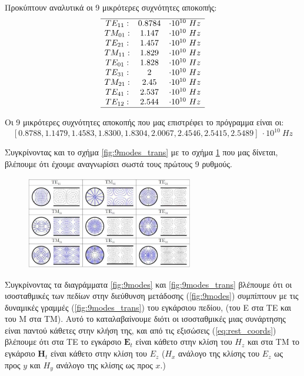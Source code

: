 \documentclass[10pt, letterpaper]{article}
\begin{document}
Προκύπτουν αναλυτικά οι 9 μικρότερες συχνότητες αποκοπής:
\[
\begin{matrix}
  \hline
  TE_{11}: &  0.8784 &\cdot 10^{10} \ Hz \\
  TM_{01}: & 1.147 &\cdot 10^{10} \ Hz \\
  TE_{21}: & 1.457 &\cdot 10^{10} \ Hz \\
  TM_{11}: & 1.829 &\cdot 10^{10} \ Hz \\
  TE_{01}: & 1.828 &\cdot 10^{10} \ Hz \\
  TE_{31}: & 2 &\cdot 10^{10} \ Hz \\
  TM_{21}: & 2.45 &\cdot 10^{10} \ Hz \\
  TE_{41}: & 2.537 &\cdot 10^{10} \ Hz \\
  TE_{12}: & 2.544 &\cdot 10^{10} \ Hz \\
  \hline
\end{matrix}
\]

Οι 9 μικρότερες συχνότητες αποκοπής που μας επιστρέφει το πρόγραμμα είναι οι:
\[ [0.8788, 1.1479, 1.4583, 1.8300, 1.8304, 2.0067, 2.4546, 2.5415, 2.5489] \ \cdot 10^{10} \ Hz \]



Συγκρίνοντας και το σχήμα \ref{fig:9modes_trans}
με το σχήμα 
\ref{fig:given} που μας δίνεται, βλέπουμε ότι έχουμε 
αναγνωρίσει σωστά τους πρώτους 9 ρυθμούς.

\begin{figure}[h]
  \centering
  \includegraphics[width=0.65\textwidth]{given.png}
  \caption{}
  \label{fig:given}
\end{figure}

Συγκρίνοντας τα διαγράμματα \ref{fig:9modes} και \ref{fig:9modes_trans} βλέπουμε ότι οι ισοσταθμικές των πεδίων στην διεύθυνση μετάδοσης (\ref{fig:9modes})
συμπίπτουν με τις δυναμικές γραμμές (\ref{fig:9modes_trans}) του εγκάρσιου πεδίου, (του Ε στα ΤΕ και του Μ στα ΤΜ). 
Αυτό το καταλαβαίνουμε διότι οι ισοσταθμικές μιας συνάρτησης είναι παντού κάθετες στην κλήση της, και από τις εξισώσεις 
(\ref{eq:rest_coords}) βλέπουμε ότι στα ΤΕ το εγκάρσιο $\mathbf{E}_t$ είναι κάθετο στην κλίση του $H_z$ και στα ΤΜ το εγκάρσιο $\mathbf{H}_t$ είναι 
κάθετο στην κλίση του $E_z$ ($H_x$ ανάλογο της κλίσης του $E_z$ ως προς $y$ και $H_y$ ανάλογο της κλίσης ως προς $x$.)
\end{document}
